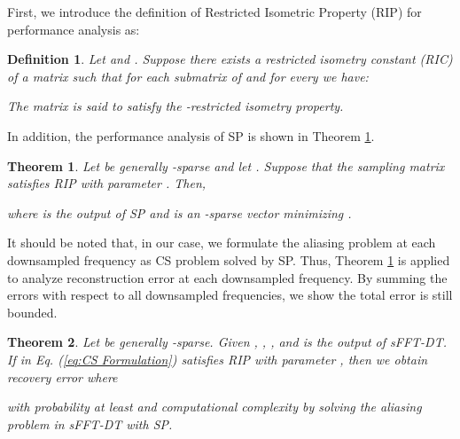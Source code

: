 \documentclass[journal,onecolumn,11pt]{IEEEtran}
\newtheorem{theorem}{Theorem}
\newtheorem{definition}{Definition}
\begin{document}
First, we introduce the definition of Restricted Isometric Property (RIP) for performance analysis as:
\begin{definition}
\label{definition:RIP}
Let  and . Suppose there exists a restricted isometry constant (RIC)  of a matrix  such that for each  submatrix  of  and for every  we have:
 
The matrix  is said to satisfy the -restricted isometry property.
\end{definition}
In addition, the performance analysis of SP \cite{Dai2009} is shown in Theorem \ref{theorem:sp performance}.
\begin{theorem}
\label{theorem:sp performance}
Let  be generally -sparse and let .
Suppose that the sampling matrix satisfies RIP with parameter .
Then,
\small

\normalsize
where  is the output of SP and  is an -sparse vector minimizing .
\end{theorem}
It should be noted that, in our case, we formulate the aliasing problem at each downsampled frequency as CS problem solved by SP.
Thus, Theorem \ref{theorem:sp performance} is applied to analyze reconstruction error at each downsampled frequency.
By summing the errors with respect to all downsampled frequencies, we show the total error is still bounded.
\begin{theorem}
\label{theorem:sFFT performance without no pruning}
Let  be generally -sparse.
Given , , , and  is the output of sFFT-DT.
If  in Eq. (\ref{eq:CS Formulation}) satisfies RIP with parameter , then we obtain recovery error
 where

with probability at least  and computational complexity  by solving the aliasing problem in sFFT-DT with SP.
\end{theorem}
\end{document}
